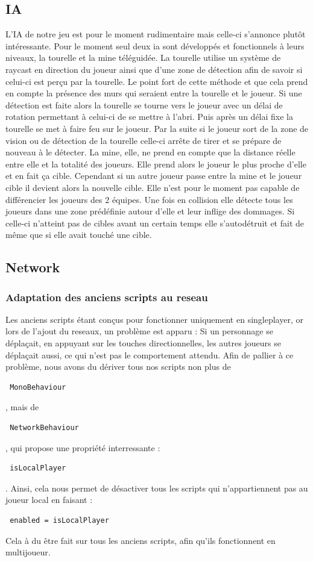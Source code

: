 ﻿\documentclass[12pt]{article}
\begin{document}
\subsection {IA}
L'IA de notre jeu est pour le moment rudimentaire mais celle-ci s'annonce plutôt intéressante.
Pour le moment seul deux ia sont développés et fonctionnels à leurs niveaux, la tourelle et la mine téléguidée.
La tourelle utilise un système de raycast en direction du joueur ainsi que d'une zone de détection afin de savoir
si celui-ci est perçu par la tourelle. Le point fort de cette méthode et que cela prend en compte la présence des
murs qui seraient entre la tourelle et le joueur. Si une détection est faite alors la tourelle se tourne vers le
joueur avec un délai de rotation permettant à celui-ci de se mettre à l'abri. Puis après un délai fixe la tourelle
se met à faire feu sur le joueur. Par la suite si le joueur sort de la zone de vision ou de détection de la tourelle
celle-ci arrête de tirer et se prépare de nouveau à le détecter.
La mine, elle, ne prend en compte que la distance réelle entre elle et la totalité des joueurs. Elle prend alors le
joueur le plus proche d'elle et en fait ça cible. Cependant si un autre joueur passe entre la mine et le joueur cible
il devient alors la nouvelle cible. Elle n'est pour le moment pas capable de différencier les joueurs des 2 équipes.
Une fois en collision elle détecte tous les joueurs dans une zone prédéfinie autour d'elle et leur inflige des dommages.
Si celle-ci n'atteint pas de cibles avant un certain temps elle s'autodétruit et fait de même que si elle avait touché une cible.
\subsection{Network}
\subsubsection {Adaptation des anciens scripts au reseau}
Les anciens scripts étant conçus pour fonctionner uniquement en singleplayer,
or lors de l'ajout du reseaux, un problème est apparu :
Si un personnage se déplaçait, en appuyant sur les touches directionnelles,
les autres joueurs se déplaçait aussi, ce qui n'est pas le comportement attendu.
Afin de pallier à ce problème, nous avons du dériver tous nos scripts non plus de
\begin{verbatim} MonoBehaviour \end{verbatim}, mais de \begin{verbatim} NetworkBehaviour \end{verbatim}
, qui propose une propriété interressante :
\begin{verbatim} isLocalPlayer \end{verbatim}.
Ainsi, cela nous permet de désactiver tous les scripts qui n'appartiennent pas au joueur local en faisant :
\begin{verbatim} enabled = isLocalPlayer \end{verbatim}
Cela à du être fait sur tous les anciens scripts, afin qu'ils fonctionnent en multijoueur.
\end{document}

